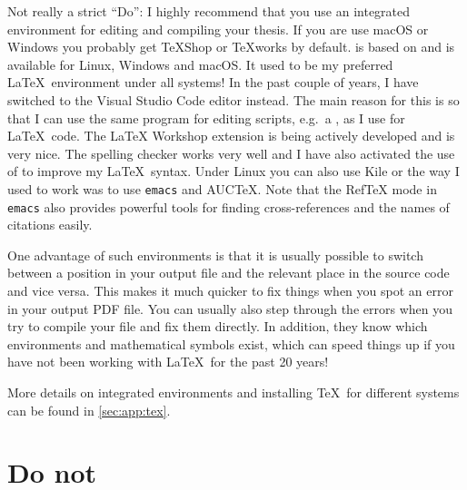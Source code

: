Not really a strict \enquote{Do}: I highly recommend that you use an
integrated environment for editing and compiling your thesis.
If you are use macOS or Windows you probably get TeXShop or TeXworks by default.
\TeXstudio is based on \TeXmaker and is available for Linux,
Windows and macOS\@.
It used to be my preferred \LaTeX\ environment under all systems!
In the past couple of years,
I have switched to the Visual Studio Code editor instead.
The main reason for this is so that I can use the same program
for editing scripts, e.g.\ a , as I use for \LaTeX\ code.
The \textsf{LaTeX Workshop} extension is being actively developed
and is very nice.
The  spelling checker works very well
and I have also activated the use of  to improve my \LaTeX\ syntax.
Under Linux you can also use Kile or the way I used to work
was to use \texttt{emacs} and AUCTeX.
Note that the RefTeX mode in \texttt{emacs} also provides powerful
tools for finding cross-references and the names of citations easily.

One advantage of such environments is that it is usually
possible to switch between a position in your output file
and the relevant place in the source code and vice versa.
This makes it much quicker to fix
things when you spot an error in your output PDF file. You can usually
also step through the errors when you try to compile your file and fix
them directly. In addition, they know which environments and
mathematical symbols exist, which can speed things up if you have not
been working with \LaTeX\ for the past 20 years!

More details on integrated environments and installing \TeX\ for different systems can be found
in \cref{sec:app:tex}.


\section{Do not}%
\label{sec:tips:dont}

